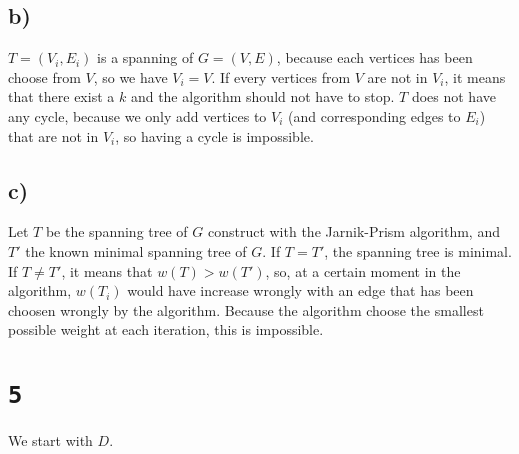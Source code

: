 \documentclass[a4paper,11pt]{report}
\begin{document}
\subsection*{b)}

$T = (V_i,E_i)$ is a spanning of $G = (V,E)$, because each vertices has been
choose from $V$, so we have $V_i = V$. If every vertices from $V$ are not in
$V_i$, it means that there exist a $k$ and the algorithm should not have to
stop. $T$ does not have any cycle, because we only add vertices to $V_i$ (and
corresponding edges to $E_i$) that are not in $V_i$, so having a cycle is
impossible.

\subsection*{c)}

Let $T$ be the spanning tree of $G$ construct with the Jarnik-Prism algorithm,
and $T'$ the known minimal spanning tree of $G$. If $T = T'$, the spanning tree
is minimal. If $T \neq T'$, it means that $w(T) > w(T')$, so, at a certain
moment in the algorithm, $w(T_i)$ would have increase wrongly with an edge that
has been choosen wrongly by the algorithm. Because the algorithm choose the
smallest possible weight at each iteration, this is impossible.

\section*{\texttt{5}}

\begin{center}
\end{center}

We start with $D$.
\end{document}
